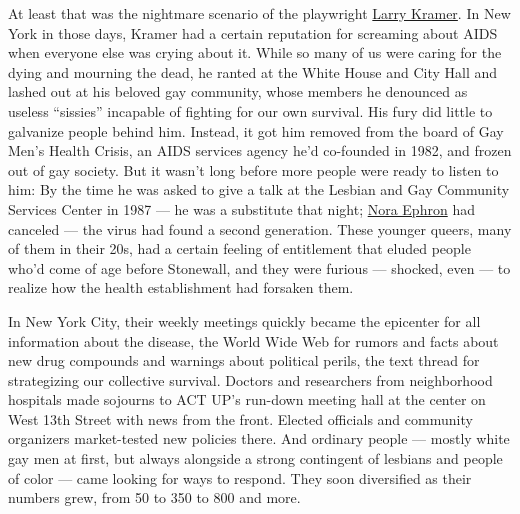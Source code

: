 At least that was the nightmare scenario of the playwright
\href{https://www.nytimes3xbfgragh.onion/2020/03/28/nyregion/coronavirus-larry-kramer-aids.html}{Larry
Kramer}. In New York in those days, Kramer had a certain reputation for
screaming about AIDS when everyone else was crying about it. While so
many of us were caring for the dying and mourning the dead, he ranted at
the White House and City Hall and lashed out at his beloved gay
community, whose members he denounced as useless ``sissies'' incapable
of fighting for our own survival. His fury did little to galvanize
people behind him. Instead, it got him removed from the board of Gay
Men's Health Crisis, an AIDS services agency he'd co-founded in 1982,
and frozen out of gay society. But it wasn't long before more people
were ready to listen to him: By the time he was asked to give a talk at
the Lesbian and Gay Community Services Center in 1987 --- he was a
substitute that night;
\href{https://www.nytimes3xbfgragh.onion/topic/person/nora-ephron}{Nora
Ephron} had canceled --- the virus had found a second generation. These
younger queers, many of them in their 20s, had a certain feeling of
entitlement that eluded people who'd come of age before Stonewall, and
they were furious --- shocked, even --- to realize how the health
establishment had forsaken them.

In New York City, their weekly meetings quickly became the epicenter for
all information about the disease, the World Wide Web for rumors and
facts about new drug compounds and warnings about political perils, the
text thread for strategizing our collective survival. Doctors and
researchers from neighborhood hospitals made sojourns to ACT UP's
run-down meeting hall at the center on West 13th Street with news from
the front. Elected officials and community organizers market-tested new
policies there. And ordinary people --- mostly white gay men at first,
but always alongside a strong contingent of lesbians and people of color
--- came looking for ways to respond. They soon diversified as their
numbers grew, from 50 to 350 to 800 and more.

